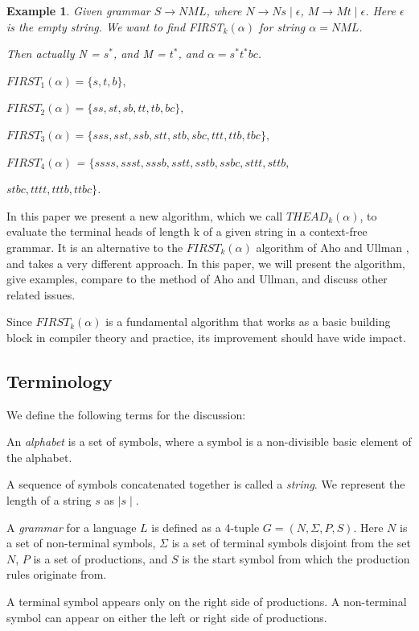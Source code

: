 \documentclass{sig-alternate-05-2015}
\newtheorem{SampleEnv}{Example}[section]
\begin{document}
\begin{SampleEnv}
Given grammar $S\rightarrow NML$, where $N\rightarrow Ns\mid \epsilon$, $M\rightarrow Mt\mid\epsilon$.
Here $\epsilon$ is the empty string. We want to find FIRST$_k(\alpha)$ for string $\alpha = NML$.

Then actually N = $s^*$, and M = $t^*$, and $\alpha=s^*t^*bc$.

$FIRST_1(\alpha)= \{s,t,b\}, $

$FIRST_2(\alpha)=\{ss,st,sb,tt,tb,bc\}, $

$FIRST_3(\alpha)=\{sss,sst,ssb,stt,stb,sbc,ttt,ttb,tbc\},$

$FIRST_4(\alpha)$ = $\{ssss,ssst,sssb,sstt,sstb,ssbc,sttt,sttb,$

$stbc,tttt,tttb,ttbc\}$.
\end{SampleEnv}

In this paper we present a new algorithm, which we call
$THEAD_k(\alpha)$, to evaluate the terminal heads of length k of a
given string in a context-free grammar. It is an alternative
to the $FIRST_k(\alpha)$ algorithm of Aho and Ullman \cite{aho72parsing}, and
takes a very different approach. In this paper, we will present
the algorithm, give examples, compare to the method
of Aho and Ullman, and discuss other related issues.

Since $FIRST_k(\alpha)$ is a fundamental algorithm that works
as a basic building block in compiler theory and practice,
its improvement should have wide impact.

\subsection{Terminology}
We define the following terms for the discussion:

An \textit{alphabet} is a set of symbols, where a symbol is a
non-divisible basic element of the alphabet.

A sequence of symbols concatenated together is called a
\textit{string}. We represent the length of a string $s$ as $\mid s \mid$.

A \textit{grammar} for a language $L$ is defined as a 4-tuple $G = (N, \Sigma, P, S)$. Here $N$ is a set of non-terminal symbols, 
$\Sigma$ is a
set of terminal symbols disjoint from the set $N$, $P$ is a set of
productions, and $S$ is the start symbol from which the production
rules originate from.

A terminal symbol appears only on the right side of productions.
A non-terminal symbol can appear on either the
left or right side of productions.
\end{document}
